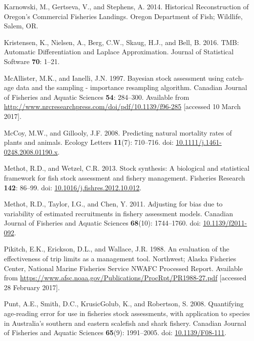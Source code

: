 \documentclass[12pt,]{article}
\begin{document}
\hypertarget{ref-karnowski_historical_2014}{}
Karnowski, M., Gertseva, V., and Stephens, A. 2014. Historical
Reconstruction of Oregon's Commercial Fisheries Landings. Oregon
Department of Fish; Wildlife, Salem, OR.

\hypertarget{ref-kristensen_tmb:_2016}{}
Kristensen, K., Nielsen, A., Berg, C.W., Skaug, H.J., and Bell, B. 2016.
TMB: Automatic Differentiation and Laplace Approximation. Journal of
Statistical Software \textbf{70}: 1--21.

\hypertarget{ref-mcallister_bayesian_1997}{}
McAllister, M.K., and Ianelli, J.N. 1997. Bayesian stock assessment
using catch-age data and the sampling - importance resampling algorithm.
Canadian Journal of Fisheries and Aquatic Sciences \textbf{54}:
284--300. Available from
\url{http://www.nrcresearchpress.com/doi/pdf/10.1139/f96-285}
{[}accessed 10 March 2017{]}.

\hypertarget{ref-mccoy_predicting_2008}{}
McCoy, M.W., and Gillooly, J.F. 2008. Predicting natural mortality rates
of plants and animals. Ecology Letters \textbf{11}(7): 710--716. doi:
\href{https://doi.org/10.1111/j.1461-0248.2008.01190.x}{10.1111/j.1461-0248.2008.01190.x}.

\hypertarget{ref-methot_stock_2013}{}
Methot, R.D., and Wetzel, C.R. 2013. Stock synthesis: A biological and
statistical framework for fish stock assessment and fishery management.
Fisheries Research \textbf{142}: 86--99. doi:
\href{https://doi.org/10.1016/j.fishres.2012.10.012}{10.1016/j.fishres.2012.10.012}.

\hypertarget{ref-methot_adjusting_2011}{}
Methot, R.D., Taylor, I.G., and Chen, Y. 2011. Adjusting for bias due to
variability of estimated recruitments in fishery assessment models.
Canadian Journal of Fisheries and Aquatic Sciences \textbf{68}(10):
1744--1760. doi:
\href{https://doi.org/10.1139/f2011-092}{10.1139/f2011-092}.

\hypertarget{ref-pikitch_evaluation_1988}{}
Pikitch, E.K., Erickson, D.L., and Wallace, J.R. 1988. An evaluation of
the effectiveness of trip limits as a management tool. Northwest; Alaska
Fisheries Center, National Marine Fisheries Service NWAFC Processed
Report. Available from
\url{https://www.afsc.noaa.gov/Publications/ProcRpt/PR1988-27.pdf}
{[}accessed 28 February 2017{]}.

\hypertarget{ref-punt_quantifying_2008}{}
Punt, A.E., Smith, D.C., KrusicGolub, K., and Robertson, S. 2008.
Quantifying age-reading error for use in fisheries stock assessments,
with application to species in Australia's southern and eastern
scalefish and shark fishery. Canadian Journal of Fisheries and Aquatic
Sciences \textbf{65}(9): 1991--2005. doi:
\href{https://doi.org/10.1139/F08-111}{10.1139/F08-111}.
\end{document}
